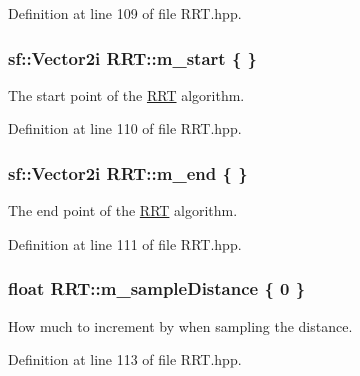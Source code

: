 Definition at line 109 of file R\+R\+T.\+hpp.

\hypertarget{classRRT_a4f0394ed9f6cd596f13b19a1617e56f9}{
\subsubsection[{m\+\_\+start}]{\setlength{\rightskip}{0pt plus 5cm}sf\+::\+Vector2i R\+R\+T\+::m\+\_\+start \{ \}\hspace{0.3cm}{\ttfamily [private]}}}\label{classRRT_a4f0394ed9f6cd596f13b19a1617e56f9}


The start point of the \hyperlink{classRRT}{R\+R\+T} algorithm. 



Definition at line 110 of file R\+R\+T.\+hpp.

\hypertarget{classRRT_a96f886227de84066adb285cbc6dcb2f5}{
\subsubsection[{m\+\_\+end}]{\setlength{\rightskip}{0pt plus 5cm}sf\+::\+Vector2i R\+R\+T\+::m\+\_\+end \{ \}\hspace{0.3cm}{\ttfamily [private]}}}\label{classRRT_a96f886227de84066adb285cbc6dcb2f5}


The end point of the \hyperlink{classRRT}{R\+R\+T} algorithm. 



Definition at line 111 of file R\+R\+T.\+hpp.

\hypertarget{classRRT_ad1501f1319a73e96ebdc3a9bb76dbdca}{
\subsubsection[{m\+\_\+sample\+Distance}]{\setlength{\rightskip}{0pt plus 5cm}float R\+R\+T\+::m\+\_\+sample\+Distance \{ 0 \}\hspace{0.3cm}{\ttfamily [private]}}}\label{classRRT_ad1501f1319a73e96ebdc3a9bb76dbdca}


How much to increment by when sampling the distance. 



Definition at line 113 of file R\+R\+T.\+hpp.

